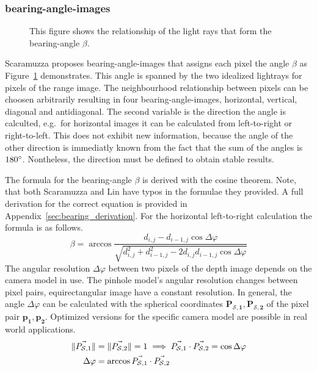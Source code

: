 \subsubsection{\Glspl{bearing-angle-image}}

\begin{figure}[H]
    \centering
    \scalebox{0.9}{%
    }
    \caption[Schematic Representation of Bearing-Angles]{This figure shows the relationship of the light rays that form the \gls{bearing-angle} $\beta$.}\label{fig:bearing_angle}
\end{figure}

Scaramuzza\cite{Scaramuzza2007} proposes \Glspl{bearing-angle-image} that assigns each pixel the angle $\beta$ as Figure~\ref{fig:bearing_angle} demonstrates.
This angle is spanned by the two idealized lightrays for pixels of the range image.
The neighbourhood relationship between pixels can be choosen arbitrarily resulting in four \Glspl{bearing-angle-image}, horizontal, vertical, diagonal and antidiagonal.
The second variable is the direction the angle is calculted, e.g.~for horizontal images it can be calculated from left-to-right or right-to-left.
This does not exhibit new information, because the angle of the other direction is immediatly known from the fact that the sum of the angles is $180\degree$.
Nontheless, the direction must be defined to obtain stable results.

The formula for the \gls{bearing-angle} $\beta$ is derived with the cosine theorem.
Note, that both Scaramuzza\cite{Scaramuzza2007} and Lin\cite{Lin2017} have typos in the formulae they provided.
A full derivation for the correct equation is provided in Appendix~\ref{sec:bearing_derivation}.
For the horizontal left-to-right calculation the formula is as follows.
\begin{equation}\label{eq:bearing-angle}
    \beta = \arccos%
            \frac{d_{i,j} - d_{i-1,j} \cos \Delta\varphi}%
                 {\sqrt{d_{i,j}^2 + d_{i-1,j}^2 - 2 d_{i,j} d_{i-1,j} \cos \Delta\varphi}}
\end{equation}
The angular resolution $\Delta\varphi$ between two pixels of the depth image depends on the camera model in use.
The pinhole model's angular resolution changes between pixel pairs, equirectangular image have a constant resolution.
In general, the angle $\Delta\varphi$ can be calculated with the spherical coordinates $\mathbf{P_{\mathcal{S},1}}, \mathbf{P_{\mathcal{S},2}}$ of the pixel pair $\mathbf{p_1}, \mathbf{p_2}$.
Optimized versions for the specific camera model are possible in real world applications.
\begin{equation}
\begin{aligned}
    \lVert\vec{P_{\mathcal{S},1}}\rVert &= \lVert\vec{P_{\mathcal{S},2}}\rVert = 1 \implies \vec{P_{\mathcal{S},1}} \cdot \vec{P_{\mathcal{S},2}} = \cos \Delta\varphi \\
    \Delta\varphi &= \arccos \vec{P_{\mathcal{S},1}} \cdot \vec{P_{\mathcal{S},2}}
\end{aligned}
\end{equation}

